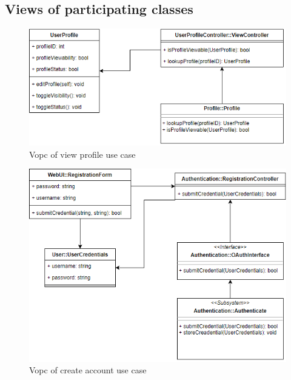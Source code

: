 \documentclass[a4paper]{article}
\begin{document}
\subsection{Views of participating classes}
\begin{figure}[H]
    \centering
    \includegraphics[width=1.0\textwidth]{vopc_view_profile.png}
    \caption{Vopc of view profile use case}
    \label{fig:fig21}
\end{figure}

\begin{figure}[H]
    \centering
    \includegraphics[width=1.0\textwidth]{vopc_register.png}
    \caption{Vopc of create account use case}
    \label{fig:fig22}
\end{figure}
\end{document}
